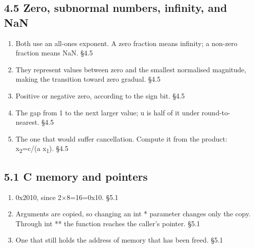 \documentclass[11pt]{article}
\begin{document}
\begin{keepsection}\subsection{4.5 Zero, subnormal numbers, infinity, and NaN}

\begin{enumerate}
\item Both use an all-ones exponent. A zero fraction means infinity; a non-zero fraction means NaN. \hfill{\small\color{FAUblue}§4.5}
\item They represent values between zero and the smallest normalised magnitude, making the transition toward zero gradual. \hfill{\small\color{FAUblue}§4.5}
\item Positive or negative zero, according to the sign bit. \hfill{\small\color{FAUblue}§4.5}
\item The gap from 1 to the next larger value; u is half of it under round-to-nearest. \hfill{\small\color{FAUblue}§4.5}
\item The one that would suffer cancellation. Compute it from the product: x\textsubscript{2}=c/(a x\textsubscript{1}). \hfill{\small\color{FAUblue}§4.5}
\end{enumerate}

\end{keepsection}
\begin{keepsection}\subsection{5.1 C memory and pointers}

\begin{enumerate}
\item 0x2010, since 2\ensuremath{\times}8=16=0x10. \hfill{\small\color{FAUblue}§5.1}
\item Arguments are copied, so changing an int * parameter changes only the copy. Through int ** the function reaches the caller’s pointer. \hfill{\small\color{FAUblue}§5.1}
\item One that still holds the address of memory that has been freed. \hfill{\small\color{FAUblue}§5.1}
\end{enumerate}

\end{keepsection}
\end{document}
